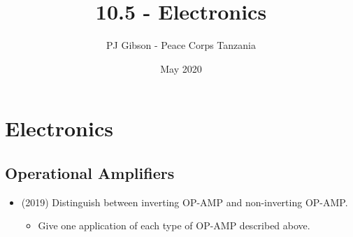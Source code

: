 \documentclass{article}
\title{10.5 - Electronics}
\author{PJ Gibson - Peace Corps Tanzania}
\date{May 2020}
\begin{document}
\maketitle


\section{Electronics}

\subsection{Operational Amplifiers}
\begin{itemize}
\item (2019)  Distinguish between inverting OP-AMP and non-inverting OP-AMP. 
 \begin{itemize}
\item Give one application of each type of OP-AMP described above.
\end{itemize}
\end{itemize}
\end{document}
